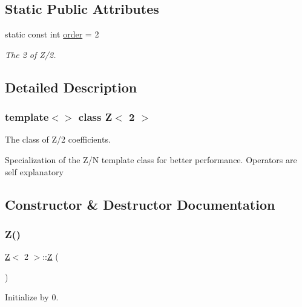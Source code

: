 \subsection*{Static Public Attributes}
\begin{DoxyCompactItemize}
\item 
static const int \hyperlink{classZ_3_012_01_4_a113854b6a1c2fec88ed352c117515c0e}{order} = 2
\begin{DoxyCompactList}\small\item\em The 2 of Z/2. \end{DoxyCompactList}\end{DoxyCompactItemize}


\subsection{Detailed Description}
\subsubsection*{template$<$$>$\newline
class Z$<$ 2 $>$}

The class of Z/2 coefficients. 

Specialization of the Z/N template class for better performance. Operators are self explanatory 

\subsection{Constructor \& Destructor Documentation}
\mbox{\label{classZ_3_012_01_4_a2007d91fc07c751853ae945c0ece1c94}} 
\subsubsection{\texorpdfstring{Z()}{Z()}\hspace{0.1cm}{\footnotesize\ttfamily [1/5]}}
{\footnotesize\ttfamily \hyperlink{classZ}{Z}$<$ 2 $>$\+::\hyperlink{classZ}{Z} (\begin{DoxyParamCaption}{ }\end{DoxyParamCaption})\hspace{0.3cm}{\ttfamily [inline]}}



Initialize by 0. 

\mbox{\label{classZ_3_012_01_4_a42d7b146ce0e257ea7a7cc79e6140872}} 
